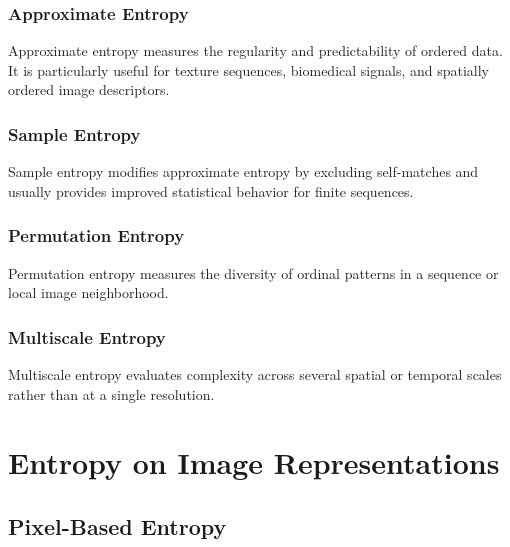 \documentclass[11pt,oneside]{book}
\theoremstyle{remark}
\begin{document}
	\section{Approximate Entropy}
	
	Approximate entropy measures the regularity and predictability of ordered data.
	It is particularly useful for texture sequences, biomedical signals, and
	spatially ordered image descriptors.
	
	\section{Sample Entropy}
	
	Sample entropy modifies approximate entropy by excluding self-matches and
	usually provides improved statistical behavior for finite sequences.
	
	\section{Permutation Entropy}
	
	Permutation entropy measures the diversity of ordinal patterns in a sequence
	or local image neighborhood.
	
	\section{Multiscale Entropy}
	
	Multiscale entropy evaluates complexity across several spatial or temporal
	scales rather than at a single resolution.
	
	
	\part{Entropy on Image Representations}
	
	
	\chapter{Pixel-Based Entropy}
	\label{chap:pixel-entropy}
	
\end{document}
